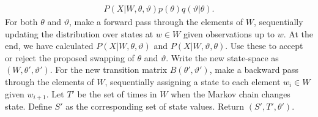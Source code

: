 \begin{algorithm}[H]
\begin{algorithmic}[1]
\begin{align*}
        {P(X| W,\theta, \vartheta)p(\theta) q(\vartheta|\theta)}.
        \end{align*}
    \State For both $\theta$ and $\vartheta$, make a forward pass through the 
    elements of $W$, sequentially updating the distribution over states at 
    $w \in W$ given observations up to $w$. At the end, we have calculated
    $P(X|W,\theta, \vartheta)$ and $P(X|W,\vartheta, \theta)$. Use these to accept or reject the
    proposed swapping of $\theta$ and $\vartheta$. Write the new state-space
    as $(W,\theta',\vartheta')$.
    \State For the new transition matrix $B(\theta',\vartheta')$, make a backward pass through 
    the elements of
    $W$, sequentially assigning a state to each element $w_i \in W$ given 
    $w_{i+1}$.
    \State Let $T'$ be the set of times in $W$ when the Markov chain changes state. Define $S'$ as the corresponding set of state values. Return $(S', T', \theta')$.
\end{algorithmic}
\end{algorithm}

